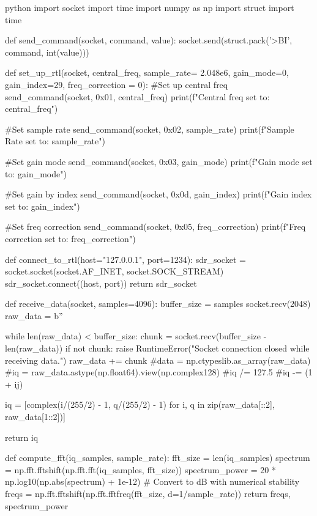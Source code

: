\begin{sourcecode}[]{python}{}
    import socket
    import time
    import numpy as np
    import struct
    import time
    
    def send_command(socket, command, value):
        socket.send(struct.pack('>BI', command, int(value)))
        
    def set_up_rtl(socket, central_freq, sample_rate= 2.048e6, gain_mode=0, gain_index=29, freq_correction = 0):
        #Set up central freq
        send_command(socket, 0x01, central_freq)
        print(f"Central freq set to: {central_freq}")
    
        #Set sample rate
        send_command(socket, 0x02, sample_rate)
        print(f"Sample Rate set to: {sample_rate}")
    
        #Set gain mode
        send_command(socket, 0x03, gain_mode)
        print(f"Gain mode set to: {gain_mode}")
    
        #Set gain by index
        send_command(socket, 0x0d, gain_index)
        print(f"Gain index set to: {gain_index}")
    
        #Set freq correction
        send_command(socket, 0x05, freq_correction)
        print(f"Freq correction set to: {freq_correction}")
    
    def connect_to_rtl(host="127.0.0.1", port=1234):
        sdr_socket = socket.socket(socket.AF_INET, socket.SOCK_STREAM)
        sdr_socket.connect((host, port))
        return sdr_socket
    
    def receive_data(socket, samples=4096):
        buffer_size = samples
        socket.recv(2048)
        raw_data = b''
        
        while len(raw_data) < buffer_size:
            chunk = socket.recv(buffer_size - len(raw_data))
            if not chunk:
                raise RuntimeError("Socket connection closed while receiving data.")
            raw_data += chunk
        #data = np.ctypeslib.as_array(raw_data)
        #iq = raw_data.astype(np.float64).view(np.complex128)
        #iq /= 127.5
        #iq -= (1 + ij)
    
        iq  = [complex(i/(255/2) - 1, q/(255/2) - 1) for i, q in zip(raw_data[::2], raw_data[1::2])]
    
        return iq
    
    def compute_fft(iq_samples, sample_rate):
        fft_size = len(iq_samples)
        spectrum = np.fft.fftshift(np.fft.fft(iq_samples, fft_size))
        spectrum_power = 20 * np.log10(np.abs(spectrum) + 1e-12)  # Convert to dB with numerical stability
        freqs = np.fft.fftshift(np.fft.fftfreq(fft_size, d=1/sample_rate))
        return freqs, spectrum_power
\end{sourcecode}

